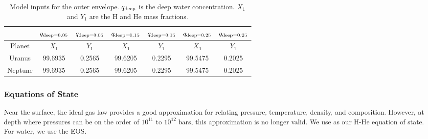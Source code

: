 \documentclass[11pt]{ucscthesisbs}
\begin{document}
\begin{table}[]
\centering
\begin{tabular}{ccccccc}
                              & $q_{\rm deep = 0.05}$        & $q_{\rm deep = 0.05}$        & $q_{\rm deep = 0.15}$        & $q_{\rm deep = 0.15}$        & $q_{\rm deep = 0.25}$        & $q_{\rm deep = 0.25}$        \\ \hline
\multicolumn{1}{|c|}{Planet}  & \multicolumn{1}{c|}{$X_{1}$} & \multicolumn{1}{c|}{$Y_{1}$} & \multicolumn{1}{c|}{$X_{1}$} & \multicolumn{1}{c|}{$Y_{1}$} & \multicolumn{1}{c|}{$X_{1}$} & \multicolumn{1}{c|}{$Y_{1}$} \\ \hline
\multicolumn{1}{|c|}{Uranus}  & \multicolumn{1}{c|}{99.6935} & \multicolumn{1}{c|}{0.2565}  & \multicolumn{1}{c|}{99.6205} & \multicolumn{1}{c|}{0.2295}  & \multicolumn{1}{c|}{99.5475} & \multicolumn{1}{c|}{0.2025}  \\ \hline
\multicolumn{1}{|c|}{Neptune} & \multicolumn{1}{c|}{99.6935} & \multicolumn{1}{c|}{0.2565}  & \multicolumn{1}{c|}{99.6205} & \multicolumn{1}{c|}{0.2295}  & \multicolumn{1}{c|}{99.5475} & \multicolumn{1}{c|}{0.2025}  \\ \hline
\end{tabular}
\caption{Model inputs for the outer envelope. $q_{\rm deep}$ is the deep water concentration. $X_{1}$ and $Y_{1}$ are the H and He mass fractions.}
\label{tab:outer_envelope_mass_fractions}
\end{table}

\subsubsection{Equations of State}
Near the surface, the ideal gas law provides a good approximation for relating pressure, temperature, density, and composition. However, at depth where pressures can be on the order of $10^{11}$ to $10^{12}$ bars, this approximation is no longer valid. We use \citep{chabrier_eos} as our H-He equation of state. For water, we use the \citep{mazevet_2019} EOS. 
\end{document}
